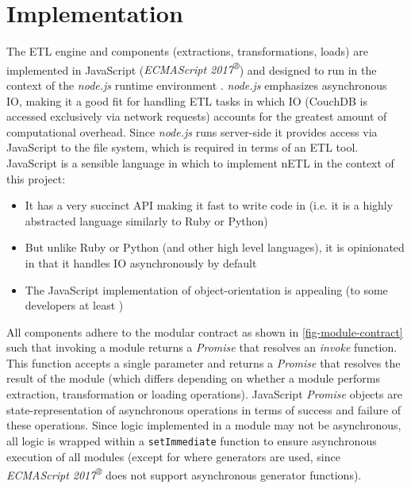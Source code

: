 \section{Implementation}
The ETL engine and components (extractions, transformations, loads) are implemented in JavaScript (\textit{ECMAScript 2017\textsuperscript{®}}) \cite{ecmascript2017} and designed to run in the context of the \textit{node.js} runtime environment \cite{nodejs}. \textit{node.js} emphasizes asynchronous IO, making it a good fit for handling ETL tasks in which IO (CouchDB is accessed exclusively via network requests) accounts for the greatest amount of computational overhead. Since \textit{node.js} runs server-side it provides access via JavaScript to the file system, which is required in terms of an ETL tool. JavaScript is a sensible language in which to implement nETL in the context of this project:

\begin{itemize}
    \item It has a very succinct API making it fast to write code in (i.e. it is a highly abstracted language similarly to Ruby or Python)
    \item But unlike Ruby or Python (and other high level languages), it is opinionated in that it handles IO asynchronously by default
    \item The JavaScript implementation of object-orientation is appealing (to some developers at least \cite{jsBook})
\end{itemize}

All components adhere to the modular contract as shown in \ref{fig-module-contract} such that invoking a module returns a \textit{Promise} \cite{jsPromises} that resolves an \textit{invoke} function. This function accepts a single parameter and returns a \textit{Promise} that resolves the result of the module (which differs depending on whether a module performs extraction, transformation or loading operations). JavaScript \textit{Promise} objects are state-representation of asynchronous operations in terms of success and failure of these operations. Since logic implemented in a module may not be asynchronous, all logic is wrapped within a \texttt{setImmediate} function to ensure asynchronous execution of all modules (except for where generators are used, since \textit{ECMAScript 2017\textsuperscript{®}} does not support asynchronous generator functions).



